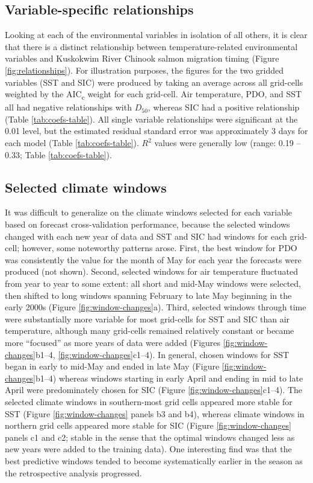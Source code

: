 \documentclass[12pt,]{book}
\theoremstyle{definition}
\theoremstyle{definition}
\theoremstyle{definition}
\theoremstyle{remark}
\begin{document}
\subsection{Variable-specific
relationships}\label{variable-specific-relationships}

\noindent
Looking at each of the environmental variables in isolation of all
others, it is clear that there is a distinct relationship between
temperature-related environmental variables and Kuskokwim River Chinook
salmon migration timing (Figure \ref{fig:relationships}). For
illustration purposes, the figures for the two gridded variables (SST
and SIC) were produced by taking an average across all grid-cells
weighted by the AIC\textsubscript{c} weight for each grid-cell. Air
temperature, PDO, and SST all had negative relationships with
\(D_{50}\), whereas SIC had a positive relationship (Table
\ref{tab:coefs-table}). All single variable relationships were
significant at the 0.01 level, but the estimated residual standard error
was approximately 3 days for each model (Table \ref{tab:coefs-table}).
\(R^2\) values were generally low (range: 0.19 -- 0.33; Table
\ref{tab:coefs-table}).

\subsection{Selected climate windows}\label{selected-climate-windows}

\noindent
It was difficult to generalize on the climate windows selected for each
variable based on forecast cross-validation performance, because the
selected windows changed with each new year of data and SST and SIC had
windows for each grid-cell; however, some noteworthy patterns arose.
First, the best window for PDO was consistently the value for the month
of May for each year the forecasts were produced (not shown). Second,
selected windows for air temperature fluctuated from year to year to
some extent: all short and mid-May windows were selected, then shifted
to long windows spanning February to late May beginning in the early
2000s (Figure \ref{fig:window-changes}a). Third, selected windows
through time were substantially more variable for most grid-cells for
SST and SIC than air temperature, although many grid-cells remained
relatively constant or became more ``focused'' as more years of data
were added (Figures \ref{fig:window-changes}b1--4,
\ref{fig:window-changes}c1--4). In general, chosen windows for SST began
in early to mid-May and ended in late May (Figure
\ref{fig:window-changes}b1--4) whereas windows starting in early April
and ending in mid to late April were predominately chosen for SIC
(Figure \ref{fig:window-changes}c1--4). The selected climate windows in
southern-most grid cells appeared more stable for SST (Figure
\ref{fig:window-changes} panels b3 and b4), whereas climate windows in
northern grid cells appeared more stable for SIC (Figure
\ref{fig:window-changes} panels c1 and c2; stable in the sense that the
optimal windows changed less as new years were added to the training
data). One interesting find was that the best predictive windows tended
to become systematically earlier in the season as the retrospective
analysis progressed.
\end{document}

